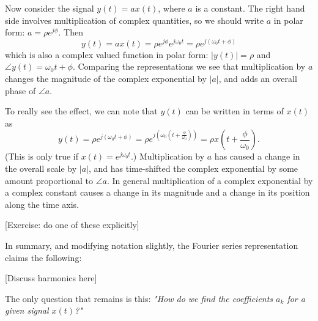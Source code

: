 \documentclass[10pt]{beamer}
\begin{document}
Now consider the signal $y(t) = a x(t)$, where $a$ is a constant.  The right hand side involves multiplication of complex quantities, so we should write $a$ in polar form:  $a = \rho e^{j \phi}$.  Then
\begin{equation*}
  y(t) = a x(t) = \rho e^{j \phi} e^{j \omega_0 t} = \rho e^{j (\omega_0 t + \phi)} 
\end{equation*}
which is also a complex valued function in polar form:  $|y(t)| = \rho$ and $\angle y(t) = \omega_0 t + \phi$.  Comparing the representations we see that multiplication by $a$ changes the magnitude of the complex exponential by $|a|$, and adds an overall phase of $\angle a$.

To really see the effect, we can note that $y(t)$ can be written in terms of $x(t)$ as
\begin{equation*}
  y(t) = \rho e^{j (\omega_0 t + \phi)} 
  = \rho e^{j \left( \omega_0 \left( t + \frac{\phi}{\omega_0} \right) \right)}
  = \rho x \left( t + \frac{\phi}{\omega_0} \right).
\end{equation*}
(This is only true if $x(t) = e^{j \omega_0 t}$.)  Multiplication by $a$ has caused a change in the overall scale by $|a|$, and has time-shifted the complex exponential by some amount proportional to $\angle a$.  In general multiplication of a complex exponential by a complex constant causes a change in its magnitude and a change in its position along the time axis.

[Exercise:  do one of these explicitly]

In summary, and modifying notation slightly, the Fourier series representation claims the following:
\begin{center}
\end{center}

[Discuss harmonics here]

The only question that remains is this:  {\em "How do we find the coefficients $a_k$ for a given signal $x(t)$?"}
\end{document}
